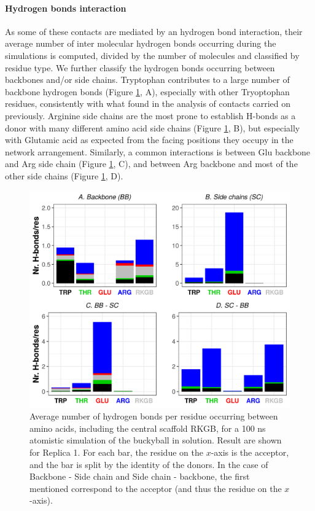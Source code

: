 \paragraph{Hydrogen bonds interaction} As some of these contacts are mediated by an hydrogen bond interaction, their average number of inter molecular hydrogen bonds occurring during the simulations is computed, divided by the number of molecules and classified by residue type.
We further classify the hydrogen bonds occurring between backbones and/or side chains. Tryptophan contributes to a large number of backbone hydrogen bonds (Figure \ref{fig:BTI_hbonds}, A), especially with other Tryoptophan residues, consistently with what found in the analysis of contacts carried on previously. Arginine side chains are the most prone to establish H-bonds as a donor with many different amino acid side chains (Figure \ref{fig:BTI_hbonds}, B), but especially with Glutamic acid as expected from the facing positions they occupy in the network arrangement.
%
Similarly, a common interactions is between Glu backbone and Arg side chain (Figure \ref{fig:BTI_hbonds}, C), and between Arg backbone and most of the other side chains (Figure \ref{fig:BTI_hbonds}, D).
\begin{figure}[t]
\centering
\includegraphics[width=0.85\linewidth]{3results_capsule/pics/Hb_all.png} 
\caption[Hydrogen bonds in the buckyball molecule]{Average number of hydrogen bonds per residue occurring between amino acids, including the central scaffold RKGB, for a 100 ns atomistic simulation of the buckyball in solution. Result are shown for Replica 1. For each bar, the residue on the $x$-axis is the acceptor, and the bar is split by the identity of the donors. In the case of Backbone - Side chain and Side chain - backbone, the first mentioned correspond to the acceptor (and thus the residue on the $x$-axis).}
\label{fig:BTI_hbonds}
\end{figure}


